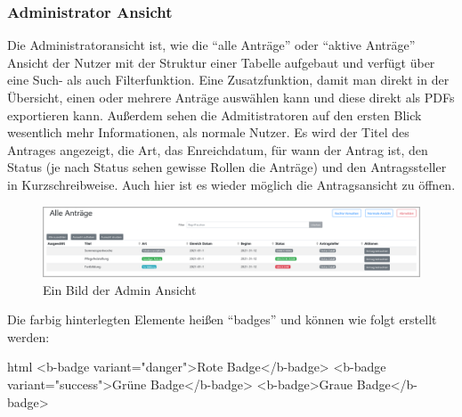 \subsubsection{Administrator Ansicht}
\label{chapter:implementierung-frontend-komponenten-admin}
Die Administratoransicht ist, wie die \enquote{alle Anträge} oder \enquote{aktive Anträge} Ansicht der Nutzer mit der Struktur einer Tabelle aufgebaut und verfügt über eine Such- als auch Filterfunktion. Eine Zusatzfunktion, damit man direkt in der Übersicht, einen oder mehrere Anträge auswählen kann und diese direkt als PDFs exportieren kann. Außerdem sehen die Admitistratoren auf den ersten Blick wesentlich mehr Informationen, als normale Nutzer. Es wird der Titel des Antrages angezeigt, die Art, das Enreichdatum, für wann der Antrag ist, den Status (je nach Status sehen gewisse Rollen die Anträge) und den Antragssteller in Kurzschreibweise. Auch hier ist es wieder möglich die Antragsansicht zu öffnen.
\begin{figure}[H]
	\centering
	\includegraphics[width=1\linewidth]{images/ldehner_implementierung/admin}
	\caption[Administrator Ansicht]{Ein Bild der Admin Ansicht}
	\label{fig:adminview}
\end{figure}
Die farbig hinterlegten Elemente heißen \enquote{badges} und können wie folgt erstellt werden:
\begin{code}{html}
	<b-badge variant="danger">Rote Badge</b-badge>
	<b-badge variant="success">Grüne Badge</b-badge>
	<b-badge>Graue Badge</b-badge>
\end{code}
	\label{list:badgebsp} ~\\
~\\

\newpage
